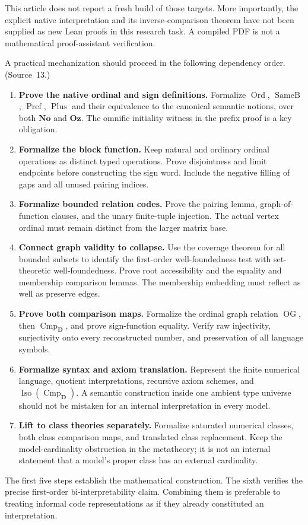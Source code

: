 \documentclass[11pt,letterpaper]{article}
\theoremstyle{definition}
\theoremstyle{remark}
\newcommand{\No}{\mathbf{No}}
\newcommand{\Ord}{\operatorname{Ord}}
\newcommand{\Oz}{\mathbf{Oz}}
\newcommand{\EqB}{\operatorname{SameB}}
\newcommand{\Prefp}{\operatorname{Pref}}
\newcommand{\Plusp}{\operatorname{Plus}}
\newcommand{\OG}{\operatorname{OG}}
\newcommand{\Cmp}{\operatorname{Cmp}}
\newcommand{\Dd}{\mathbf{D}}
\begin{document}
This article does not report a fresh build of those targets. More importantly, the
explicit native interpretation and its inverse-comparison theorem have not been
supplied as new Lean proofs in this research task. A compiled PDF is not a
mathematical proof-assistant verification.

A practical mechanization should proceed in the following dependency order.
(Source~13.)
\begin{enumerate}
\item \textbf{Prove the native ordinal and sign definitions.} Formalize $\Ord$,
$\EqB$, $\Prefp$, $\Plusp$ and their equivalence to the canonical semantic notions,
over both $\No$ and $\Oz$. The omnific initiality witness in the prefix proof is a
key obligation.
\item \textbf{Formalize the block function.} Keep natural and ordinary ordinal
operations as distinct typed operations. Prove disjointness and limit endpoints
before constructing the sign word. Include the negative filling of gaps and all
unused pairing indices.
\item \textbf{Formalize bounded relation codes.} Prove the pairing lemma,
graph-of-function clauses, and the unary finite-tuple injection. The actual vertex
ordinal must remain distinct from the larger matrix base.
\item \textbf{Connect graph validity to collapse.} Use the coverage theorem for all
bounded subsets to identify the first-order well-foundedness test with
set-theoretic well-foundedness. Prove root accessibility and the equality and
membership comparison lemmas. The membership embedding must reflect as well as
preserve edges.
\item \textbf{Prove both comparison maps.} Formalize the ordinal graph relation
$\OG$, then $\Cmp_{\Dd}$, and prove sign-function equality. Verify raw injectivity,
surjectivity onto every reconstructed number, and preservation of all language
symbols.
\item \textbf{Formalize syntax and axiom translation.} Represent the finite
numerical language, quotient interpretations, recursive axiom schemes, and
$\operatorname{Iso}(\Cmp_{\Dd})$. A semantic construction inside one ambient type
universe should not be mistaken for an internal interpretation in every model.
\item \textbf{Lift to class theories separately.} Formalize saturated numerical
classes, both class comparison maps, and translated class replacement. Keep the
model-cardinality obstruction in the metatheory; it is not an internal statement
that a model's proper class has an external cardinality.
\end{enumerate}
The first five steps establish the mathematical construction. The sixth verifies the
precise first-order bi-interpretability claim. Combining them is preferable to
treating informal code representations as if they already constituted an
interpretation.
\end{document}
